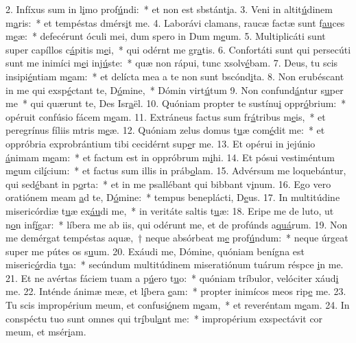 2. Infíxus sum in l\uline{i}mo prof\uline{ú}ndi:~* et non est sbstánt\uline{i}a.
3. Veni in altit\uline{ú}dinem m\uline{a}ris:~* et tempéstas dmérs\uline{i}t me.
4. Laborávi clamans, raucæ factæ sunt f\uline{au}ces m\uline{e}æ:~* defecérunt óculi mei, dum spero in Dum m\uline{e}um.
5. Multiplicáti sunt super capíllos c\uline{á}pitis m\uline{e}i,~* qui odérnt me gr\uline{a}tis.
6. Confortáti sunt qui persecúti sunt me inimíci m\uline{e}i inj\uline{ú}ste:~* quæ non rápui, tunc xsolv\uline{é}bam.
7. Deus, tu scis insipi\uline{é}ntiam m\uline{e}am:~* et delícta mea a te non sunt bscónd\uline{i}ta.
8. Non erubéscant in me qui exsp\uline{é}ctant te, D\uline{ó}mine,~* Dómin virt\uline{ú}tum
9. Non confund\uline{á}ntur s\uline{u}per me~* qui quærunt te, Des Isr\uline{a}ël.
10. Quóniam propter te sustínu\uline{i} oppr\uline{ó}brium:~* opéruit confúsio fácem m\uline{e}am.
11. Extráneus factus sum fr\uline{á}tribus m\uline{e}is,~* et peregrínus fíliis mtris m\uline{e}æ.
12. Quóniam zelus domus t\uline{u}æ com\uline{é}dit me:~* et oppróbria exprobrántium tibi cecidérnt sup\uline{e}r me.
13. Et opérui in jejúnio \uline{á}nimam m\uline{e}am:~* et factum est in oppróbrum m\uline{i}hi.
14. Et pósui vestiméntum m\uline{e}um cil\uline{í}cium:~* et factus sum illis in práb\uline{o}lam.
15. Advérsum me loquebántur, qui sed\uline{é}bant in p\uline{o}rta:~* et in me psallébant qui bibbant v\uline{i}num.
16. Ego vero oratiónem meam \uline{a}d te, D\uline{ó}mine:~* tempus beneplácti, D\uline{e}us.
17. In multitúdine misericórdiæ t\uline{u}æ ex\uline{áu}di me,~* in veritáte saltis t\uline{u}æ:
18. Eripe me de luto, ut n\uline{o}n inf\uline{í}gar:~* líbera me ab iis, qui odérunt me, et de profúnds a\uline{quá}rum.
19. Non me demérgat tempéstas aquæ,~† neque absórbeat m\uline{e} prof\uline{ú}ndum:~* neque úrgeat super me pútes os s\uline{u}um.
20. Exáudi me, Dómine, quóniam benígna est miseric\uline{ó}rdia t\uline{u}a:~* secúndum multitúdinem miseratiónum tuárum réspce \uline{i}n me.
21. Et ne avértas fáciem tuam a p\uline{ú}ero t\uline{u}o:~* quóniam tríbulor, velóciter xáud\uline{i} me.
22. Inténde ánimæ meæ, et l\uline{í}bera \uline{e}am:~* propter inimícos meos rip\uline{e} me.
23. Tu scis impropérium meum, et confusi\uline{ó}nem m\uline{e}am,~* et reveréntam m\uline{e}am.
24. In conspéctu tuo sunt omnes qui tr\uline{í}bul\uline{a}nt me:~* impropérium exspectávit cor meum, et msér\uline{i}am.
